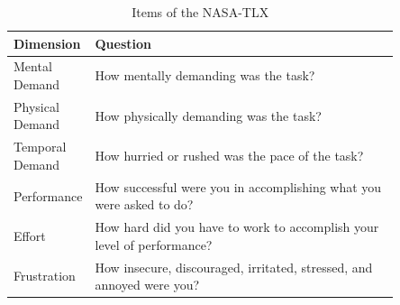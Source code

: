 \documentclass[acmsmall]{acmart}
\begin{document}
\begin{table}[htpb]
  \centering
  \caption{Items of the NASA-TLX}
  \label{tab:app_nasatlx}
  \begin{tabular}{lp{0.85\linewidth}}
    \toprule
    \textbf{Dimension} & \textbf{Question} \\
    \midrule
    Mental Demand & How mentally demanding was the task? \\
    Physical Demand & How physically demanding was the task? \\
    Temporal Demand & How hurried or rushed was the pace of the task? \\
    Performance & How successful were you in accomplishing what you were asked to do? \\
    Effort & How hard did you have to work to accomplish your level of performance? \\
    Frustration & How insecure, discouraged, irritated, stressed, and annoyed were you? \\
    \bottomrule
  \end{tabular}
\end{table}
\end{document}
